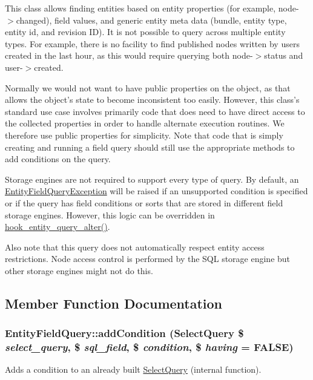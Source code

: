 This class allows finding entities based on entity properties (for example, node-\/$>$changed), field values, and generic entity meta data (bundle, entity type, entity id, and revision ID). It is not possible to query across multiple entity types. For example, there is no facility to find published nodes written by users created in the last hour, as this would require querying both node-\/$>$status and user-\/$>$created.

Normally we would not want to have public properties on the object, as that allows the object's state to become inconsistent too easily. However, this class's standard use case involves primarily code that does need to have direct access to the collected properties in order to handle alternate execution routines. We therefore use public properties for simplicity. Note that code that is simply creating and running a field query should still use the appropriate methods to add conditions on the query.

Storage engines are not required to support every type of query. By default, an \hyperlink{classEntityFieldQueryException}{EntityFieldQueryException} will be raised if an unsupported condition is specified or if the query has field conditions or sorts that are stored in different field storage engines. However, this logic can be overridden in \hyperlink{group__hooks_ga22d97ef7297e17697cdaa8b32483f412}{hook\_\-entity\_\-query\_\-alter()}.

Also note that this query does not automatically respect entity access restrictions. Node access control is performed by the SQL storage engine but other storage engines might not do this. 

\subsection{Member Function Documentation}
\hypertarget{classEntityFieldQuery_ace9480802a8dbdf23f1d7091aaf7d336}{
\subsubsection[{addCondition}]{\setlength{\rightskip}{0pt plus 5cm}EntityFieldQuery::addCondition ({\bf SelectQuery} \$ {\em select\_\-query}, \/  \$ {\em sql\_\-field}, \/  \$ {\em condition}, \/  \$ {\em having} = {\ttfamily FALSE})}}
\label{classEntityFieldQuery_ace9480802a8dbdf23f1d7091aaf7d336}
Adds a condition to an already built \hyperlink{classSelectQuery}{SelectQuery} (internal function).

